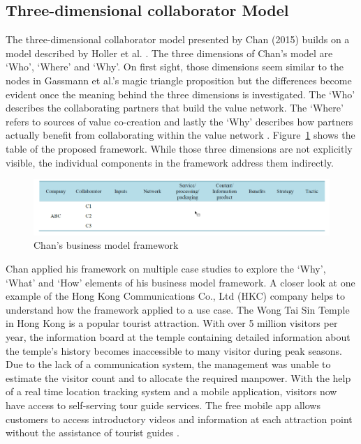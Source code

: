 	\subsection{Three-dimensional collaborator Model}

		The three-dimensional collaborator model presented by Chan (2015) \cite{chan} builds on a model described by Holler et al. \cite{holler}. The three dimensions of Chan's model are `Who', `Where' and `Why'. On first sight, those dimensions seem similar to the nodes in Gassmann et al.'s magic triangle proposition but the differences become evident once the meaning behind the three dimensions is investigated. The `Who' describes the collaborating partners that build the value network. The `Where' refers to sources of value co-creation and lastly the `Why' describes how partners actually benefit from collaborating within the value network \cite{chan}. Figure~\ref{fig:chan} shows the table of the proposed framework. While those three dimensions are not explicitly visible, the individual components in the framework address them indirectly.

		\begin{figure}[ht]
		    \begin{center}
		    \includegraphics[scale=0.5]{Talk11/chan.png}
		    \end{center}
		    \caption{Chan's business model framework \cite[p.559]{chan}}
		    \label{fig:chan}
		\end{figure}

		Chan applied his framework on multiple case studies to explore the `Why', `What' and `How'  elements of his business model framework. A closer look at one example of the Hong Kong Communications Co., Ltd (HKC) company helps to understand how the framework applied to a use case. The Wong Tai Sin Temple in Hong Kong is a popular tourist attraction. With over 5 million visitors per year, the information board at the temple containing detailed information about the temple's history becomes inaccessible to many visitor during peak seasons. Due to the lack of a communication system, the management was unable to estimate the visitor count and to allocate the required manpower. With the help of a real time location tracking system and a mobile application, visitors now have access to self-serving tour guide services. The free mobile app allows customers to access introductory videos and information at each attraction point without the assistance of tourist guides \cite[p. 560]{chan}. 

